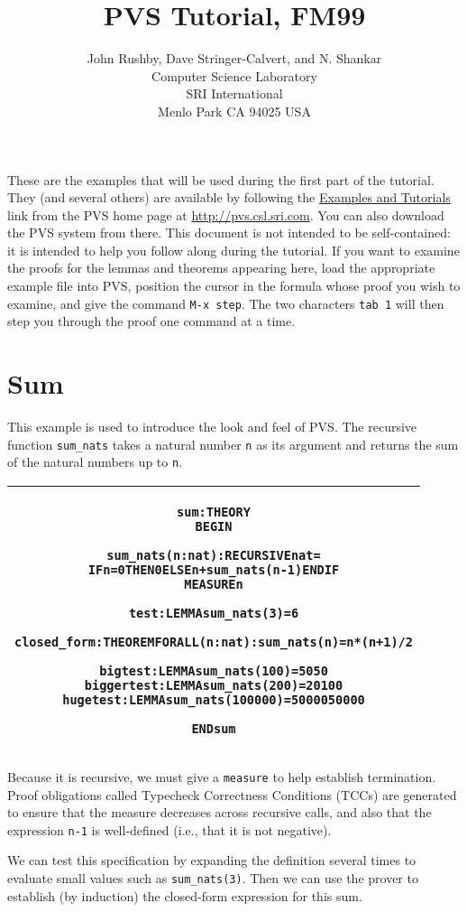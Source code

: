 \documentclass[11pt,twoside]{article}
\title{\bf PVS Tutorial, FM99} %
\author{John Rushby, Dave Stringer-Calvert, and N. Shankar\\
Computer Science Laboratory\\
SRI International\\
Menlo Park CA 94025 USA
}
\date{}
\makeatletter
\def\sessionsize{\small}
\newlength{\hsbw}
\newenvironment{session}{\begin{flushleft}
  \def\baselinestretch{1}
 \setlength{\hsbw}{\linewidth}
 \addtolength{\hsbw}{-\arrayrulewidth}
 \addtolength{\hsbw}{-\tabcolsep}
 \begin{tabular}{@{}|c@{}|@{}}\hline 
 \begin{minipage}[b]{\hsbw}
 \begingroup\sessionsize\vspace*{1.2ex}\begin{alltt}}{\end{alltt}\endgroup\end{minipage}\\ \hline
 \end{tabular}
 \end{flushleft}}
\makeatother
\begin{document}
\maketitle

These are the examples that will be used during the first part of the
tutorial.  They (and several others) are available by following the
\url{Examples and Tutorials} link from the PVS home page at
\url{http://pvs.csl.sri.com}.  You can also download the PVS system
from there.   This document is not intended to be self-contained: it
is intended to help you follow along during the tutorial.   If you
want to examine the proofs for the lemmas and theorems appearing
here, load the appropriate example file into PVS, position the cursor
in the formula whose proof you wish to examine, and give the command
{\tt M-x step}.   The two characters {\tt tab 1} will then step you
through the proof one command at a time.

\section{Sum}

This example is used to introduce the look and feel of PVS.  The
recursive function {\tt sum\_nats} takes a natural number {\tt n} as
its argument and returns the sum of the natural numbers up to {\tt n}.

\begin{session}
sum: THEORY
BEGIN

  sum_nats(n: nat): RECURSIVE nat =
    IF n=0 THEN 0 ELSE n+sum_nats(n-1) ENDIF
  MEASURE n

  test: LEMMA sum_nats(3) = 6

  closed_form: THEOREM FORALL (n:nat): sum_nats(n) = n*(n+1)/2

  bigtest: LEMMA    sum_nats(100)    = 5050
  biggertest: LEMMA sum_nats(200)    = 20100
  hugetest: LEMMA   sum_nats(100000) = 5000050000

END sum
\end{session}

Because it is recursive, we must give a {\tt measure} to help
establish termination.  Proof obligations called Typecheck Correctness
Conditions (TCCs) are generated to ensure that the measure decreases
across recursive calls, and also that the expression {\tt n-1} is
well-defined (i.e., that it is not negative).

We can test this specification by expanding the definition several
times to evaluate small values such as {\tt sum\_nats(3)}.   Then we
can use the prover to establish (by induction) the closed-form
expression for this sum.
\end{document}
